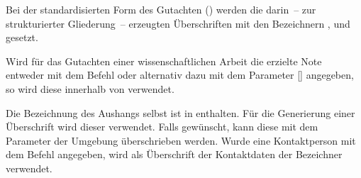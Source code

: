 \begin{Declaration*}{}
\begin{Declaration}{}
\begin{Declaration}{}
\printdeclarationlist%
%
Bei der standardisierten Form des Gutachten () werden die 
darin~-- zur strukturierter Gliederung~-- erzeugten Überschriften mit den 
Bezeichnern ,  und  
gesetzt.
\end{Declaration}
\end{Declaration}

\begin{Declaration}{}
\printdeclarationlist%
%
Wird für das Gutachten einer wissenschaftlichen Arbeit die erzielte Note 
entweder mit dem Befehl  oder alternativ dazu mit 
dem Parameter [] angegeben, so 
wird diese innerhalb von  verwendet.
\end{Declaration}

\begin{Declaration}{}
\begin{Declaration}[v2.02]{}
\printdeclarationlist%
%
Die Bezeichnung des Aushangs selbst ist in  enthalten. Für 
die Generierung einer Überschrift wird dieser verwendet. Falls gewünscht, kann 
diese mit dem Parameter  der Umgebung 
 überschrieben werden. Wurde eine Kontaktperson mit dem 
Befehl  angegeben, wird als Überschrift der Kontaktdaten 
der Bezeichner  verwendet.

\end{Declaration}
\end{Declaration}
\end{Declaration*}


